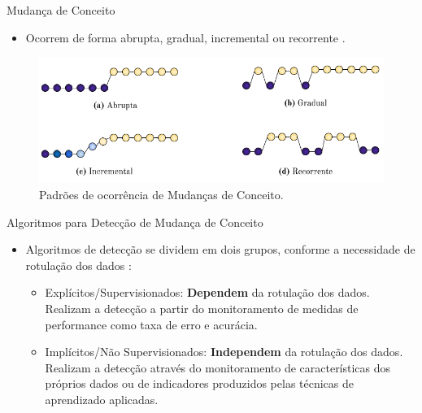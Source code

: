 \documentclass[10pt]{beamer}
\begin{document}
\begin{frame}{Mudança de Conceito}
    \begin{itemize}
        \item<1 -> Ocorrem de forma \alert{abrupta}, \alert{gradual}, \alert{incremental} ou \alert{recorrente} \cite{Zliobaite:2010}.
    \end{itemize}
    \begin{figure}[H]
        \begin{center}
            \includegraphics[scale=0.55]{imagens/concept_drift_patterns.png}
            \caption{Padrões de ocorrência de Mudanças de Conceito.}
            \label{fig:concept_drift_patterns}
        \end{center}
    \end{figure}
\end{frame}

\begin{frame}{Algoritmos para Detecção de Mudança de Conceito}
    \begin{itemize}
        \item<1 -> Algoritmos de detecção se dividem em dois grupos, conforme a necessidade de rotulação dos dados \cite{Zliobaite:2010}:
        \begin{itemize}
        \item<1 -> \alert{Explícitos/Supervisionados}: \textbf{Dependem} da rotulação dos dados. Realizam a detecção a partir do monitoramento de medidas de performance como taxa de erro e acurácia.
        \item<1 -> \alert{Implícitos/Não Supervisionados}: \textbf{Independem} da rotulação dos dados. Realizam a detecção através do monitoramento de características dos próprios dados ou de indicadores produzidos pelas técnicas de aprendizado aplicadas.
        \end{itemize}
    \end{itemize}
\end{frame}
\end{document}
